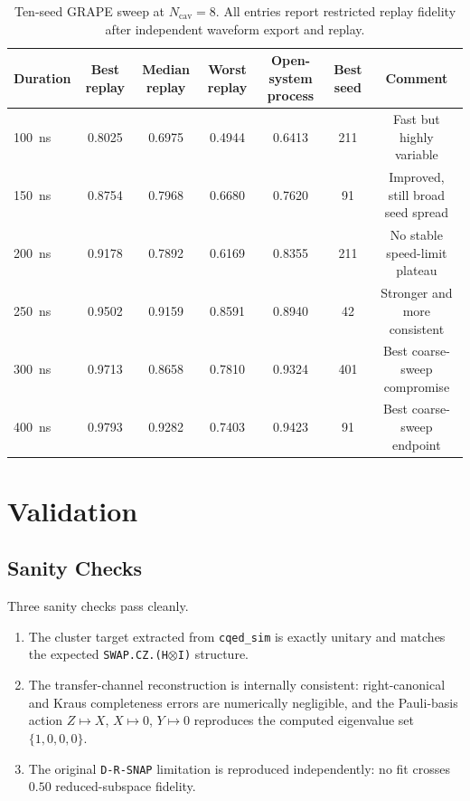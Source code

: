 \documentclass[aps,pra,twocolumn,reprint,amsmath,amssymb]{revtex4-2}
\begin{document}
\begin{table}[t]
\centering
\caption{Ten-seed GRAPE sweep at $N_{\mathrm{cav}}=8$. All entries report
restricted replay fidelity after independent waveform export and replay.}
\label{tab:grape_frontier}
\begin{tabular}{@{}lcccccc@{}}
\toprule
Duration & Best replay & Median replay & Worst replay & Open-system process & Best seed & Comment \\
\midrule
\SI{100}{ns} & 0.8025 & 0.6975 & 0.4944 & 0.6413 & 211 & Fast but highly variable \\
\SI{150}{ns} & 0.8754 & 0.7968 & 0.6680 & 0.7620 & 91 & Improved, still broad seed spread \\
\SI{200}{ns} & 0.9178 & 0.7892 & 0.6169 & 0.8355 & 211 & No stable speed-limit plateau \\
\SI{250}{ns} & 0.9502 & 0.9159 & 0.8591 & 0.8940 & 42 & Stronger and more consistent \\
\SI{300}{ns} & 0.9713 & 0.8658 & 0.7810 & 0.9324 & 401 & Best coarse-sweep compromise \\
\SI{400}{ns} & 0.9793 & 0.9282 & 0.7403 & 0.9423 & 91 & Best coarse-sweep endpoint \\
\bottomrule
\end{tabular}
\end{table}

\section{Validation}
\subsection{Sanity Checks}
Three sanity checks pass cleanly.
\begin{enumerate}
  \item The cluster target extracted from \texttt{cqed\_sim} is exactly
  unitary and matches the expected \texttt{SWAP.CZ.(H$\otimes$I)} structure.
  \item The transfer-channel reconstruction is internally consistent:
  right-canonical and Kraus completeness errors are numerically negligible, and
  the Pauli-basis action $Z\mapsto X$, $X\mapsto 0$, $Y\mapsto 0$ reproduces
  the computed eigenvalue set $\{1,0,0,0\}$.
  \item The original \texttt{D-R-SNAP} limitation is reproduced
  independently: no fit crosses $0.50$ reduced-subspace fidelity.
\end{enumerate}
\end{document}
